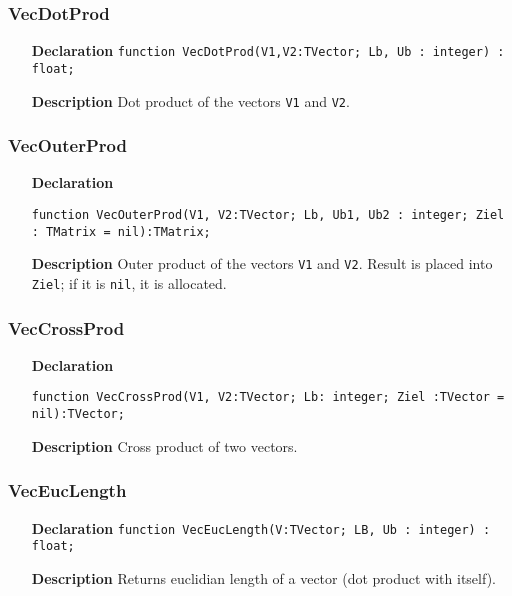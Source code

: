 \documentclass[12pt,a4paper,oneside]{report}
\newcommand{\declarationitem}[1]{\textbf{#1}}
\newcommand{\descriptiontitle}[1]{\textbf{#1}}
\newcommand{\code}[1]{\texttt{#1}}
\begin{document}
\subsubsection{VecDotProd}
\label{VecDotProd}
\begin{itemize}
	\item[\declarationitem{Declaration}\hfill]
	\code{function VecDotProd(V1,V2:TVector; Lb, Ub : integer) : float;}
	\item[\descriptiontitle{Description}]Dot product of the vectors \code{V1} and \code{V2}.
\end{itemize}
\subsubsection{VecOuterProd}
\label{VecOuterProd}
\begin{itemize}
	\item[\declarationitem{Declaration}\hfill]
	\begin{flushleft}
	\code{function VecOuterProd(V1, V2:TVector; Lb, Ub1, Ub2 : integer; Ziel : TMatrix = nil):TMatrix;}
	\end{flushleft}
	\item[\descriptiontitle{Description}]Outer product of the vectors \code{V1} and \code{V2}. Result is placed into \code{Ziel}; if it is \code{nil}, it is allocated. 
\end{itemize}
\subsubsection{VecCrossProd}
\label{VecCrossProd}
\begin{itemize}
\item[\declarationitem{Declaration}\hfill]\begin{flushleft}\code{function VecCrossProd(V1, V2:TVector; Lb: integer; Ziel :TVector = nil):TVector;}
\end{flushleft}
\item[\descriptiontitle{Description}] Cross product of two vectors.
\end{itemize}
\subsubsection{VecEucLength}
\label{VecEucLength}
\begin{itemize}
\item[\declarationitem{Declaration}\hfill]\code{function VecEucLength(V:TVector; LB, Ub : integer) : float;}
\item[\descriptiontitle{Description}]Returns euclidian length of a vector (dot product with itself).
\end{itemize}
\end{document}
